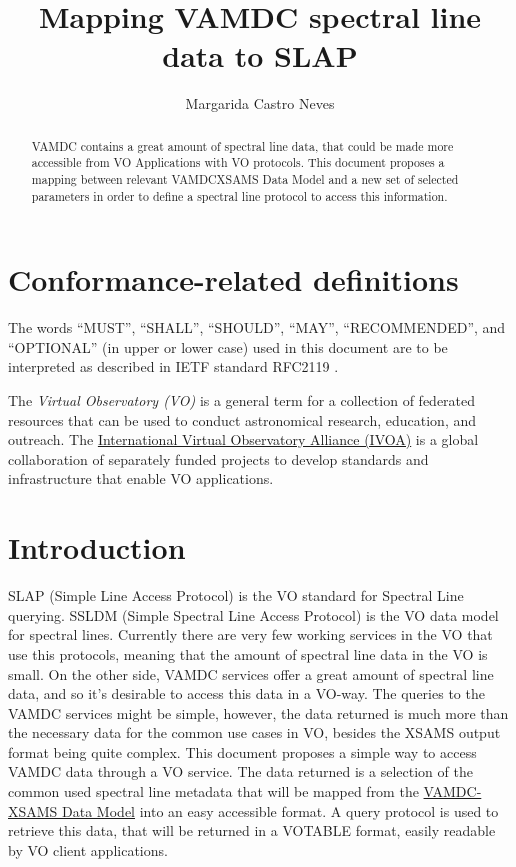 \documentclass[11pt,a4paper]{ivoa}
\title{Mapping VAMDC spectral line data to SLAP}
\author{Margarida Castro Neves}
\begin{document}
\begin{abstract}
VAMDC contains  a great amount of spectral line data, that could be made more
accessible from VO Applications with VO protocols. This document proposes a mapping 
between relevant VAMDCXSAMS Data Model and a new set of selected parameters  in 
order to define a spectral line protocol to access this information.


\end{abstract}




\section*{Conformance-related definitions}

The words ``MUST'', ``SHALL'', ``SHOULD'', ``MAY'', ``RECOMMENDED'', and
``OPTIONAL'' (in upper or lower case) used in this document are to be
interpreted as described in IETF standard RFC2119 \citep{std:RFC2119}.

The \emph{Virtual Observatory (VO)} is a
general term for a collection of federated resources that can be used
to conduct astronomical research, education, and outreach.
The \href{http://www.ivoa.net}{International
Virtual Observatory Alliance (IVOA)} is a global
collaboration of separately funded projects to develop standards and
infrastructure that enable VO applications.


\section{Introduction}

SLAP (Simple Line Access Protocol) is the VO standard for Spectral Line querying. SSLDM (Simple Spectral Line Access Protocol) is the VO data model for spectral lines.
Currently there are very few working services in the VO that use this protocols, meaning that the amount of spectral line data in the VO is small. 
On the other side, VAMDC services offer a great amount of spectral line data, and  so it's desirable to access this data in a VO-way. 
The queries to the VAMDC services might be simple, however, the data returned is much more than the necessary data for the common use cases in VO, besides the XSAMS \citep{XSAMS:Docs} output format being quite complex.
This document proposes a simple way to access VAMDC data through a VO service. The data returned is a selection of the common used spectral line metadata that will be mapped from the \href{https://standards.vamdc.eu/#data-model}{VAMDC-XSAMS Data Model} into an easy accessible format. A query protocol is used  to retrieve this data,  that will be returned in a VOTABLE format, easily readable by VO client applications.
\end{document}
